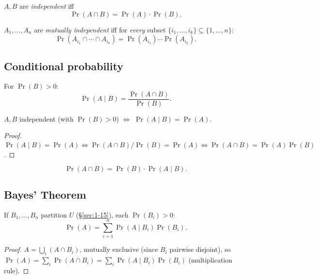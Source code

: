 \documentclass[11pt]{article}
\begin{document}
\begin{definition}[Independent]
$A,B$ are \emph{independent} iff
\[
\Pr(A\cap B) = \Pr(A)\cdot\Pr(B).
\]
\end{definition}

\bigskip
\begin{definition}
$A_1,\dots,A_n$ are \emph{mutually independent} iff for \emph{every} subset $\{i_1,\dots,i_k\}\subseteq\{1,\dots,n\}$:
\[
\Pr(A_{i_1}\cap\cdots\cap A_{i_k}) = \Pr(A_{i_1})\cdots\Pr(A_{i_k}).
\]
\end{definition}

\subsection{Conditional probability}
\label{sec:9-8}

\begin{definition}
For $\Pr(B)>0$:
\[
\Pr(A\mid B) = \frac{\Pr(A\cap B)}{\Pr(B)}.
\]
\end{definition}

\begin{theorem}
$A,B$ independent (with $\Pr(B)>0$) $\iff$ $\Pr(A\mid B)=\Pr(A)$.
\end{theorem}
\begin{proof}
$\Pr(A\mid B)=\Pr(A)\iff \Pr(A\cap B)/\Pr(B)=\Pr(A)\iff\Pr(A\cap B)=\Pr(A)\Pr(B)$.
\end{proof}

\begin{theorem}
\[
\Pr(A\cap B) = \Pr(B)\cdot\Pr(A\mid B).
\]
\end{theorem}

\subsection{Bayes' Theorem}
\label{sec:9-9}

\begin{theorem}
If $B_1,\dots,B_n$ partition $U$ (\S\ref{sec:1-15}), each $\Pr(B_i)>0$:
\[
\Pr(A) = \sum_{i=1}^n \Pr(A\mid B_i)\Pr(B_i).
\]
\end{theorem}
\begin{proof}
$A = \bigcup_i (A\cap B_i)$, mutually exclusive (since $B_i$ pairwise disjoint), so $\Pr(A)=\sum_i\Pr(A\cap B_i) = \sum_i\Pr(A\mid B_i)\Pr(B_i)$ (multiplication rule).
\end{proof}
\end{document}
